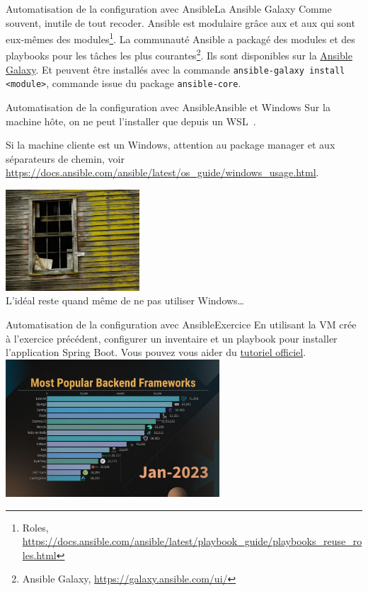 \documentclass{beamer}
\begin{document}
    \begin{frame}{Automatisation de la configuration avec Ansible}{La Ansible Galaxy}
        Comme souvent, inutile de tout recoder.
        Ansible est modulaire grâce aux  et aux  qui sont eux-mêmes des modules\footnote{Roles, \url{https://docs.ansible.com/ansible/latest/playbook_guide/playbooks_reuse_roles.html}}.
        \bigbreak
        La communauté Ansible a packagé des modules et des playbooks pour les tâches les plus courantes\footnote{Ansible Galaxy, \url{https://galaxy.ansible.com/ui/}}.
        Ils sont disponibles sur la \href{https://galaxy.ansible.com/}{Ansible Galaxy}.
        Et peuvent être installés avec la commande \lstinline{ansible-galaxy install <module>}, commande issue du package \lstinline{ansible-core}.
    \end{frame}

    \begin{frame}{Automatisation de la configuration avec Ansible}{Ansible et Windows}
        Sur la machine hôte, on ne peut l'installer que depuis un WSL~.
        \begin{dangercolorbox}
            Si la machine cliente est un Windows, attention au package manager et aux séparateurs de chemin, voir \url{https://docs.ansible.com/ansible/latest/os_guide/windows_usage.html}.
        \end{dangercolorbox}
        \bigbreak
        \centering
        \includegraphics[width=5cm]{image/broken-windows} \\ L'idéal reste quand même de ne pas utiliser Windows\ldots \\
    \end{frame}

    \begin{frame}{Automatisation de la configuration avec Ansible}{Exercice \execcounterdispinc{}}
        En utilisant la VM crée à l'exercice précédent, configurer un inventaire et un playbook pour installer l'application Spring Boot.
        \bigbreak
        Vous pouvez vous aider du \href{https://spring.io/guides/gs/spring-boot}{tutoriel officiel}.
        \bigbreak
        \centering
        \includegraphics[width=8cm]{image/most-popular-backend}
    \end{frame}
\end{document}
